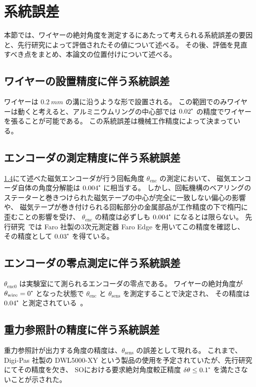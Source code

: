 \documentclass[../../main.tex]{subfiles}
\begin{document}
\section{系統誤差}
本節では、ワイヤーの絶対角度を測定するにあたって考えられる系統誤差の要因と、先行研究によって評価されたその値について述べる。
その後、評価を見直すべき点をまとめ、本論文の位置付けについて述べる。
\subsection{ワイヤーの設置精度に伴う系統誤差}
ワイヤーは $\SI{0.2}{mm}$ の溝に沿うような形で設置される。
この範囲でのみワイヤーは動くと考えると、アルミニウムリングの中心部では $0.02\tcdegree$ の精度でワイヤーを張ることが可能である。
この系統誤差は機械工作精度によって決まっている。
\subsection{エンコーダの測定精度に伴う系統誤差}
\ref{}にて述べた磁気エンコーダが行う回転角度 $\theta_{\mathrm{enc}}$ の測定において、
磁気エンコーダ自体の角度分解能は $0.004\tcdegree$ に相当する。
しかし、回転機構のベアリングのステーターと巻きつけられた磁気テープの中心が完全に一致しない偏心の影響や、
磁気テープが巻き付けられる回転部分の金属部品が工作精度の下で楕円に歪むことの影響を受け、
$\theta_{\mathrm{enc}}$ の精度は必ずしも $0.004\tcdegree$ になるとは限らない。
先行研究~\cite{swg:iijima}では Faro 社製の3次元測定器 Faro Edge を用いてこの精度を確認し、
その精度として $0.03\tcdegree$ を得ている。
\subsection{エンコーダの零点測定に伴う系統誤差}
$\theta_{\mathrm{enc}0}$ は実験室にて測られるエンコーダの零点である。
ワイヤーの絶対角度が $\theta_{\mathrm{wire}} = 0\tcdegree$ となった状態で $\theta_{\mathrm{enc}}$ と $\theta_{\mathrm{sens}}$ を測定することで決定され、
その精度は $0.04\tcdegree$ と測定されている~\cite{swg:iijima}。\\

\subsection{重力参照計の精度に伴う系統誤差}
重力参照計が出力する角度の精度は、$\theta_{\mathrm{sens}}$ の誤差として現れる。
これまで、Digi-Pas 社製の DWL5000-XY という製品の使用を予定されていたが、先行研究\cite{swg:iijima}にてその精度を欠き、
SOにおける要求絶対角度較正精度 $\delta\theta \leq 0.1\tcdegree$ を満たさないことが示された。
\end{document}
